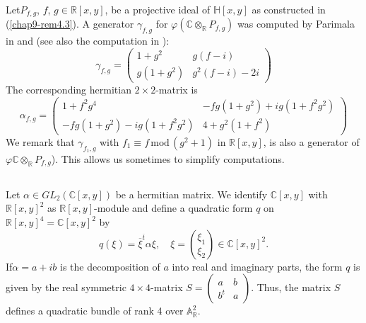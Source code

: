 \setcounter{subprop}{2}
\begin{subexam}\label{chap9-exam5.3}
Let\pageoriginale $P_{f,g}$, $f$, $g\in \mathbb{R}[x,y]$, be a projective ideal of
$\mathbb{H}[x,y]$ as constructed in (\ref{chap9-rem4.3}). A generator
$\gamma_{f,g}$ for $\varphi(\mathbb{C}\otimes_{\mathbb{R}}P_{f,g})$
was computed by Parimala in \cite{chap9-key11} and \cite{chap9-key13}
(see also the computation in \cite{chap9-key4}):
$$
\gamma_{f,g}=
\begin{pmatrix}
1+g^{2} & g(f-i)\\
g(1+g^{2}) & g^{2}(f-i)-2i
\end{pmatrix}
$$
The corresponding hermitian $2\times 2$-matrix is
$$
\alpha_{f,g}=
\begin{pmatrix}
1+f^{2}g^{4} & -fg(1+g^{2})+ig(1+f^{2}g^{2})\\
-fg(1+g^{2})-ig(1+f^{2}g^{2}) & 4+g^{2}(1+f^{2})
\end{pmatrix}
$$
We remark that $\gamma_{f_{1},g}$ with $f_{1}\equiv
f\,\text{mod}\,(g^{2}+1)$ in $\mathbb{R}[x,y]$, is also a generator of
$\varphi\mathbb{C}\otimes_{\mathbb{R}}P_{f,g}$). This allows us
sometimes to simplify computations.
\end{subexam}

\setcounter{subsection}{3}
\subsection{}\label{chap9-sec5.4}
Let $\alpha\in GL_{2}(\mathbb{C}[x,y])$ be a hermitian matrix. We
identify $\mathbb{C}[x,y]$ with $\mathbb{R}[x,y]^{2}$ as
$\mathbb{R}[x,y]$-module and define a quadratic form $q$ on
$\mathbb{R}[x,y]^{4}=\mathbb{C}[x,y]^{2}$ by
$$
q(\xi)=\overline{\xi}^{\overline{t}}\alpha\xi,\quad \xi=
\binom{\xi_{1}}{\xi_{2}}\in \mathbb{C}[x,y]^{2}.
$$
If\pageoriginale $\alpha=a+ib$ is the decomposition of $a$ into real
and imaginary parts, the form $q$ is given by the real symmetric
$4\times 4$-matrix $S=\left(\begin{smallmatrix} a & b\\ b^{t} &
a\end{smallmatrix}\right)$. Thus, the matrix $S$ defines a quadratic
bundle of rank 4 over $\mathbb{A}^{2}_{\mathbb{R}}$. 

\setcounter{subsection}{4}
\subsection{}\label{chap9-sec5.5}

